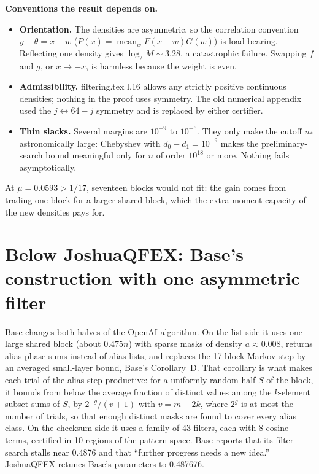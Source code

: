 \documentclass[11pt]{article}
\DeclareMathOperator{\mean}{mean}
\theoremstyle{plain}
\begin{document}
\textbf{Conventions the result depends on.}

\begin{itemize}
\item \textbf{Orientation.} The densities are asymmetric, so the correlation convention $y - \theta = x + w$ ($P(x) = \mean_w F(x+w)G(w)$) is load-bearing. Reflecting one density gives $\log_2 M \sim 3.28$, a catastrophic failure. Swapping $f$ and $g$, or $x \to -x$, is harmless because the weight is even.
\item \textbf{Admissibility.} filtering.tex l.16 allows any strictly positive continuous densities; nothing in the proof uses symmetry. The old numerical appendix used the $j \leftrightarrow 64-j$ symmetry and is replaced by either certifier.
\item \textbf{Thin slacks.} Several margins are $10^{-9}$ to $10^{-6}$. They only make the cutoff $n_*$ astronomically large: Chebyshev with $d_0 - d_1 = 10^{-9}$ makes the preliminary-search bound meaningful only for $n$ of order $10^{18}$ or more. Nothing fails asymptotically.
\end{itemize}

At $\mu = 0.0593 > 1/17$, seventeen blocks would not fit: the gain comes from trading one block for a larger shared block, which the extra moment capacity of the new densities pays for.

\section{Below JoshuaQFEX: Base's construction with one asymmetric filter}

Base changes both halves of the OpenAI algorithm. On the list side it uses one large shared block (about $0.475n$) with sparse masks of density $a \approx 0.008$, returns alias phase sums instead of alias lists, and replaces the 17-block Markov step by an averaged small-layer bound, Base's Corollary~D. That corollary is what makes each trial of the alias step productive: for a uniformly random half $S$ of the block, it bounds from below the average fraction of distinct values among the $k$-element subset sums of $S$, by $2^{-g}/(v+1)$ with $v = m - 2k$, where $2^{g}$ is at most the number of trials, so that enough distinct masks are found to cover every alias class. On the checksum side it uses a family of 43 filters, each with 8 cosine terms, certified in 10 regions of the pattern space. Base reports that its filter search stalls near 0.4876 and that ``further progress needs a new idea.'' JoshuaQFEX retunes Base's parameters to 0.487676.
\end{document}

